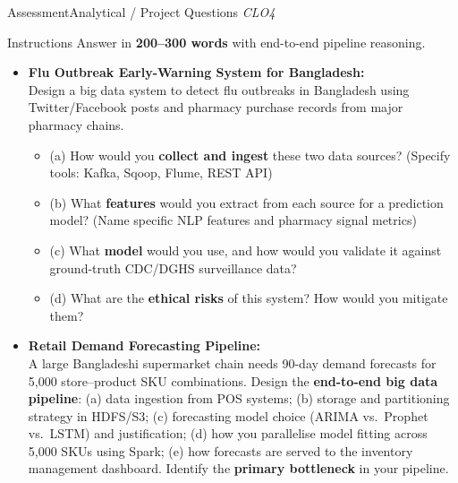 \documentclass[aspectratio=169,10pt]{beamer}
\begin{document}
\begin{frame}{Assessment\textemdash Analytical / Project Questions \hfill\small\textit{CLO4}}
  \begin{block}{Instructions}
    Answer in \textbf{200--300 words} with end-to-end pipeline reasoning.
  \end{block}
  \vspace{6pt}
  \begin{itemize}
    \item[\textbf{A1.}] \textbf{Flu Outbreak Early-Warning System for Bangladesh:}\\
    Design a big data system to detect flu outbreaks in Bangladesh using Twitter/Facebook posts and pharmacy purchase records from major pharmacy chains.
    \begin{itemize}
      \item (a) How would you \textbf{collect and ingest} these two data sources? (Specify tools: Kafka, Sqoop, Flume, REST API)
      \item (b) What \textbf{features} would you extract from each source for a prediction model?  (Name specific NLP features and pharmacy signal metrics)
      \item (c) What \textbf{model} would you use, and how would you validate it against ground-truth CDC/DGHS surveillance data?
      \item (d) What are the \textbf{ethical risks} of this system?  How would you mitigate them?
    \end{itemize}
  \end{itemize}
  \vspace{6pt}
  \begin{itemize}
    \item[\textbf{A2.}] \textbf{Retail Demand Forecasting Pipeline:}\\
    A large Bangladeshi supermarket chain needs 90-day demand forecasts for 5{,}000 store--product SKU combinations.  Design the \textbf{end-to-end big data pipeline}: (a) data ingestion from POS systems; (b) storage and partitioning strategy in HDFS/S3; (c) forecasting model choice (ARIMA vs.\ Prophet vs.\ LSTM) and justification; (d) how you parallelise model fitting across 5{,}000 SKUs using Spark; (e) how forecasts are served to the inventory management dashboard.  Identify the \textbf{primary bottleneck} in your pipeline.
  \end{itemize}
\end{frame}
\end{document}
